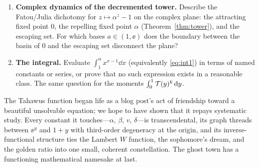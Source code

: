 \begin{enumerate}[label=\textup{(\arabic*)}, leftmargin=2.2em]
\item\label{op:tower-complex} \textbf{Complex dynamics of the
decremented tower.} Describe the Fatou/Julia dichotomy for
$z \mapsto \alpha^{z} - 1$ on the complex plane: the attracting fixed
point $0$, the repelling fixed point $\alpha$
(Theorem~\ref{thm:tower}), and the escaping set. For which bases
$a \in (1, \ee)$ does the boundary between the basin of $0$ and the
escaping set disconnect the plane?

\item\label{op:integral} \textbf{The integral.} Evaluate
$\int_{1}^{\alpha} x^{x-1}\dd x$ (equivalently
\eqref{eq:int1}) in terms of named constants or series, or prove that
no such expression exists in a reasonable class. The same question
for the moments $\int_{0}^{1} \mathcal{T}(y)^{k} \,\mathrm{d} y$.

\end{enumerate}

The Tahawus function began life as a blog post's act of friendship
toward a beautiful unsolvable equation; we hope to have shown that it
repays systematic study. Every constant it touches---$\alpha$,
$\beta$, $v$, $\delta$---is transcendental, its graph threads between
$\ee^{y}$ and $1+y$ with third-order degeneracy at the origin, and
its inverse-functional structure ties the Lambert $W$ function, the
sophomore's dream, and the golden ratio into one small, coherent
constellation. The ghost town has a functioning mathematical namesake
at last.

